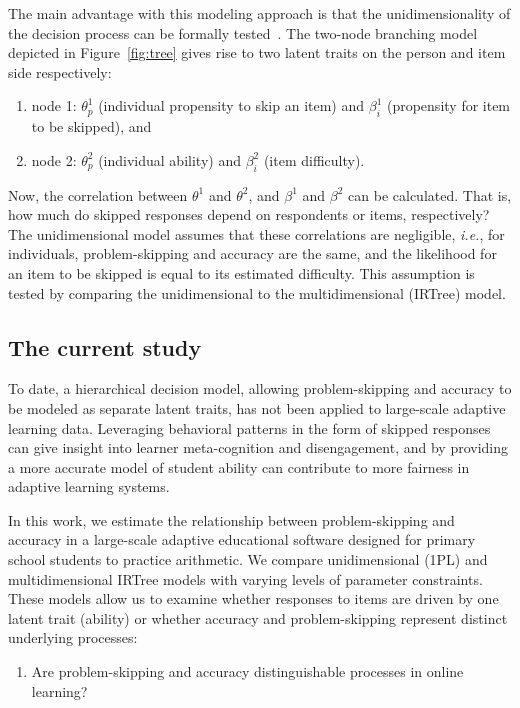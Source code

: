 \documentclass[12pt]{article}
\begin{document}
The main advantage with this modeling approach is that the unidimensionality of the decision process can be formally tested~\parencite{de2012irtrees}. The two-node branching model depicted in Figure~\ref{fig:tree} gives rise to two latent traits on the person and item side respectively: 
\begin{enumerate}
    \item node 1: $\theta_p^1$ (individual propensity to skip an item) and $\beta_i^1$ (propensity for item to be skipped), and 
    \item node 2: $\theta_p^2$ (individual ability) and $\beta_i^2$ (item difficulty).
\end{enumerate}
Now, the correlation between $\theta^1$ and $\theta^2$, and $\beta^1$ and $\beta^2$ can be calculated. That is, how much do skipped responses depend on respondents or items, respectively? The unidimensional model assumes that these correlations are negligible, \textit{i.e.}, for individuals, problem-skipping and accuracy are the same, and the likelihood for an item to be skipped is equal to its estimated difficulty. This assumption is tested by comparing the unidimensional to the multidimensional (IRTree) model. 

\subsection{The current study}
To date, a hierarchical decision model, allowing problem-skipping and accuracy to be modeled as separate latent traits, has not been applied to large-scale adaptive learning data.
Leveraging behavioral patterns in the form of skipped responses can give insight into learner meta-cognition and disengagement, and by providing a more accurate model of student ability can contribute to more fairness in adaptive learning systems. 

In this work, we estimate the relationship between problem-skipping and accuracy in a large-scale adaptive educational software designed for primary school students to practice arithmetic. We compare unidimensional (1PL) and multidimensional IRTree models with varying levels of parameter constraints. These models allow us to examine whether responses to items are driven by one latent trait (ability) or whether accuracy and problem-skipping represent distinct underlying processes:

\begin{enumerate}
    \item[\textbf{RQ1:}] Are problem-skipping and accuracy distinguishable processes in online learning?  
\end{enumerate}
\end{document}
